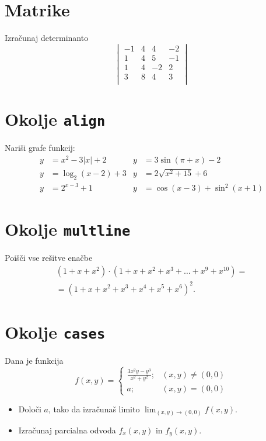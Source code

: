 \documentclass[a4paper,12pt]{article}
\begin{document}
\section*{Matrike}
Izračunaj determinanto
\[
\begin{vmatrix}
 -1 & 4 & 4 & -2 \\
  1 & 4 & 5 & -1 \\
  1 & 4 & -2 & 2 \\
  3 & 8 & 4 & 3 \\
\end{vmatrix}
\]

\section*{Okolje \texttt{align}}
Nariši grafe funkcij:
\begin{align*}
y &= x^2 - 3|x| + 2    &y &= 3 \sin(\pi+x) - 2\\
y &= \log_2(x-2) + 3   &y &= 2 \sqrt{x^2+15} + 6\\
y &= 2^{x-3} + 1       &y &= \cos(x-3) + \sin^2(x+1)
\end{align*}

\section*{Okolje \texttt{multline}}
Poišči vse rešitve enačbe
\begin{multline*}
(1+x+x^2) \cdot (1+x+x^2+x^3+\ldots+x^9+x^{10}) =\\
=(1+x+x^2+x^3+x^4+x^5+x^6)^2.
\end{multline*}

\section*{Okolje \texttt{cases}}
Dana je funkcija
\[
   f(x,y)=
    \begin{cases}
    \frac{3x^2y-y^3}{x^2+y^2}; & (x,y) \neq (0,0) \\
    a; &  (x,y) = (0,0)
    \end{cases}
 \]

\begin{itemize}
\item Določi \(a\), tako da izračunaš limito \( \lim_{(x,y)\to(0,0)} f(x,y) \).
\item Izračunaj parcialna odvoda \(f_x(x,y)\) in \(f_y(x,y)\).
\end{itemize}
\end{document}

